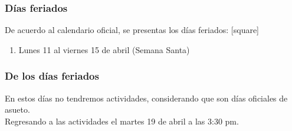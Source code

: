 \documentclass[12pt]{beamer}
\begin{document}
\begin{frame}
\frametitle{Días feriados}
De acuerdo al calendario oficial, se presentas los días feriados:
\pause
{}
[square]
\begin{enumerate}[<+->]
\item Lunes 11 al viernes 15 de abril (Semana Santa)
\end{enumerate}
\end{frame}
\begin{frame}
\frametitle{De los días feriados}
En estos días no tendremos actividades, considerando que son días oficiales de asueto.
\\
\bigskip
\pause
Regresando a las actividades el martes 19 de abril a las 3:30 pm.
\end{frame}


\end{document}
